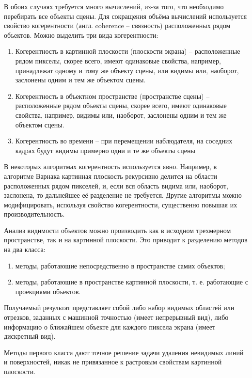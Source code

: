 В обоих случаях требуется много вычислений, из-за того, что необходимо перебирать все объекты сцены. Для сокращения объёма вычислений используется свойство когерентности (англ. coherence – связность) расположенных рядом объектов. Можно выделить три вида когерентности:

\begin{enumerate}
	\item Когерентность в картинной плоскости (плоскости экрана) – расположенные рядом пикселы, скорее всего, имеют одинаковые свойства, например, принадлежат одному и тому же объекту сцены, или видимы или, наоборот, заслонены одним и тем же объектом сцены.
	\item Когерентность в объектном пространстве (пространстве сцены) – расположенные рядом объекты сцены, скорее всего, имеют одинаковые свойства, например, видимы или, наоборот, заслонены одним и тем же объектом сцены.
	\item Когерентность во времени – при перемещении наблюдателя, на соседних кадрах будут видимы примерно одни и те же объекты сцены
\end{enumerate}

В некоторых алгоритмах когерентность используется явно. Например, в алгоритме Варнака картинная плоскость рекурсивно делится на области расположенных рядом пикселей, и, если вся область видима или, наоборот, заслонена, то дальнейшее её разделение не требуется. Другие алгоритмы можно модифицировать, используя свойство когерентности, существенно повышая их производительность.~\cite{polski}

Анализ видимости объектов можно производить как в исходном трехмерном пространстве, так и на картинной плоскости. Это приводит к разделению методов на два класса:

\begin{enumerate}
    \item методы, работающие непосредственно в пространстве самих объектов;
    \item методы, работающие в пространстве картинной плоскости, т. е. работающие с проекциями объектов.
\end{enumerate}

Получаемый результат представляет собой либо набор видимых областей или отрезков, заданных с машинной точностью (имеет непрерывный вид), либо информацию о ближайшем объекте для каждого пиксела экрана (имеет дискретный вид).

Методы первого класса дают точное решение задачи удаления невидимых линий и поверхностей, никак не привязанное к растровым свойствам картинной плоскости.

